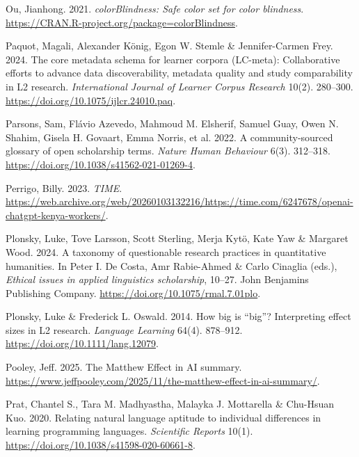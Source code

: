 \documentclass[
  letterpaper,
  DIV=11,
  numbers=noendperiod]{scrreprt}
\newlength{\cslhangindent}
\newenvironment{CSLReferences}[2] %
 {\begin{list}{}{%
  \setlength{\itemindent}{0pt}
  \setlength{\leftmargin}{0pt}
  \setlength{\parsep}{0pt}
  \ifodd #1
   \setlength{\leftmargin}{\cslhangindent}
   \setlength{\itemindent}{-1\cslhangindent}
  \fi
  \setlength{\itemsep}{#2\baselineskip}}}
 {\end{list}}
\begin{document}
\begin{CSLReferences}{1}{0}
Ou, Jianhong. 2021. \emph{colorBlindness: Safe color set for color
blindness}. \url{https://CRAN.R-project.org/package=colorBlindness}.

Paquot, Magali, Alexander König, Egon W. Stemle \& Jennifer-Carmen Frey.
2024. The core metadata schema for learner corpora (LC-meta):
Collaborative efforts to advance data discoverability, metadata quality
and study comparability in L2 research. \emph{International Journal of
Learner Corpus Research} 10(2). 280--300.
\url{https://doi.org/10.1075/ijlcr.24010.paq}.

{Parsons, Sam, Flávio Azevedo, Mahmoud M. Elsherif, Samuel Guay, Owen N.
Shahim, Gisela H. Govaart, Emma Norris, et al.} 2022. A
community-sourced glossary of {open} {scholarship} terms. \emph{Nature
Human Behaviour} 6(3). 312--318.
\url{https://doi.org/10.1038/s41562-021-01269-4}.

Perrigo, Billy. 2023. \emph{TIME}.
\url{https://web.archive.org/web/20260103132216/https://time.com/6247678/openai-chatgpt-kenya-workers/}.

Plonsky, Luke, Tove Larsson, Scott Sterling, Merja Kytö, Kate Yaw \&
Margaret Wood. 2024. A taxonomy of questionable research practices in
quantitative humanities. In Peter I. De Costa, Amr Rabie-Ahmed \& Carlo
Cinaglia (eds.), \emph{Ethical issues in applied linguistics
scholarship}, 10--27. John Benjamins Publishing Company.
\url{https://doi.org/10.1075/rmal.7.01plo}.

Plonsky, Luke \& Frederick L. Oswald. 2014. How big is {``big''}?
Interpreting effect sizes in L2 research. \emph{Language Learning}
64(4). 878--912. \url{https://doi.org/10.1111/lang.12079}.

Pooley, Jeff. 2025. The {M}atthew {E}ffect in AI summary.
\url{https://www.jeffpooley.com/2025/11/the-matthew-effect-in-ai-summary/}.

Prat, Chantel S., Tara M. Madhyastha, Malayka J. Mottarella \& Chu-Hsuan
Kuo. 2020. Relating natural language aptitude to individual differences
in learning programming languages. \emph{Scientific Reports} 10(1).
\url{https://doi.org/10.1038/s41598-020-60661-8}.


\end{CSLReferences}
\end{document}

